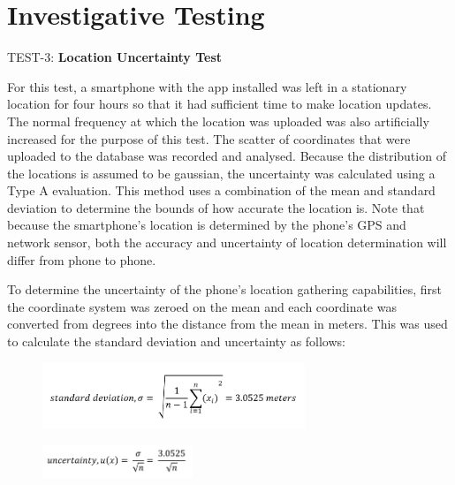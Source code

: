\section{Investigative Testing}
\label{sec:Investigative Testing}

TEST-3: \textbf{Location Uncertainty Test}

For this test, a smartphone with the app installed was left in a stationary location for four hours so that it had sufficient time to make location updates. The normal frequency at which the location was uploaded was also artificially increased for the purpose of this test. The scatter of coordinates that were uploaded to the database was recorded and analysed. Because the distribution of the locations is assumed to be gaussian, the uncertainty was calculated using a Type A evaluation. This method uses a combination of the mean and standard deviation to determine the bounds of how accurate the location is. Note that because the smartphone's location is determined by the phone's GPS and network sensor, both the accuracy and uncertainty of location determination will differ from phone to phone.

To determine the uncertainty of the phone's location gathering capabilities, first the coordinate system was zeroed on the mean and each coordinate was converted from degrees into the distance from the mean in meters. This was used to calculate the standard deviation and uncertainty as follows:

\begin{figure}[ht]
    \centering
    \includegraphics[width=0.7\textwidth]{figures/FormulaSTD.PNG}
    \label{fig:formula_std}
\end{figure}

\begin{figure}[ht]
    \centering
    \includegraphics[width=0.4\textwidth]{figures/FormulaUN.PNG}
    \label{fig:formula_std}
\end{figure}

